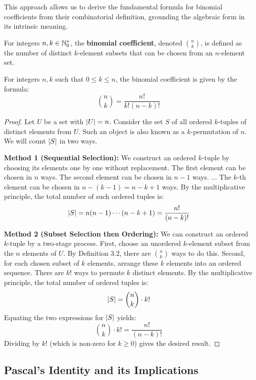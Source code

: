 This approach allows us to derive the fundamental formula for binomial coefficients from their combinatorial definition, grounding the algebraic form in its intrinsic meaning.

\begin{definition}
For integers $n, k \in \mathbb{N}_{0}^*$, the \textbf{binomial coefficient}, denoted $\binom{n}{k}$, is defined as the number of distinct $k$-element subsets that can be chosen from an $n$-element set.
\end{definition}

\begin{theorem}
For integers $n, k$ such that $0 \le k \le n$, the binomial coefficient is given by the formula:
$$ \binom{n}{k} = \frac{n!}{k!(n-k)!} $$
\end{theorem}
\begin{proof}
Let $U$ be a set with $\left| U \right|=n$. Consider the set $S$ of all ordered $k$-tuples of distinct elements from $U$. Such an object is also known as a $k$-permutation of $n$. We will count $\left| S \right|$ in two ways.

\textbf{Method 1 (Sequential Selection):} We construct an ordered $k$-tuple by choosing its elements one by one without replacement.
The first element can be chosen in $n$ ways.
The second element can be chosen in $n-1$ ways.
...
The $k$-th element can be chosen in $n-(k-1) = n-k+1$ ways.
By the multiplicative principle, the total number of such ordered tuples is:
$$ \left| S \right| = n(n-1)\cdots(n-k+1) = \frac{n!}{(n-k)!} $$

\textbf{Method 2 (Subset Selection then Ordering):} We can construct an ordered $k$-tuple by a two-stage process.
First, choose an unordered $k$-element subset from the $n$ elements of $U$. By Definition 3.2, there are $\binom{n}{k}$ ways to do this.
Second, for each chosen subset of $k$ elements, arrange these $k$ elements into an ordered sequence. There are $k!$ ways to permute $k$ distinct elements.
By the multiplicative principle, the total number of ordered tuples is:
$$ \left| S \right| = \binom{n}{k} \cdot k! $$
Equating the two expressions for $\left| S \right|$ yields:
$$ \binom{n}{k} \cdot k! = \frac{n!}{(n-k)!} $$
Dividing by $k!$ (which is non-zero for $k \ge 0$) gives the desired result.
\end{proof}

\subsection{Pascal's Identity and its Implications}

